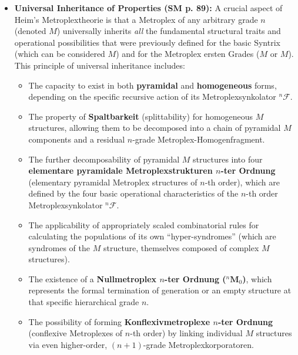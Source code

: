 \documentclass[12pt]{article}
\newcommand{\q}[1]{\enquote{#1}}
\def\metroplex#1#2{M}%
\newcommand{\hypersyntrix}{\metroplex{1}{F}}
\newcommand{\metroplexsynkolator}[1]{{}^{#1}\mathcal{F}}
\newcommand{\nullmetroplex}[1]{{}^{#1}\mathbf{M}_0}
\begin{document}
\begin{itemize}
    \item \textbf{Universal Inheritance of Properties (SM p. 89):}
    A crucial aspect of Heim's Metroplextheorie is that a Metroplex of any arbitrary grade \( n \) (denoted \( \metroplex{n}{} \)) universally inherits \textit{all} the fundamental structural traits and operational possibilities that were previously defined for the basic Syntrix (which can be considered \( \metroplex{0}{} \)) and for the Metroplex ersten Grades (\( \hypersyntrix \) or \( \metroplex{1}{} \)). This principle of universal inheritance includes:
    \begin{itemize}
        \item The capacity to exist in both \textbf{pyramidal} and \textbf{homogeneous} forms, depending on the specific recursive action of its Metroplexsynkolator \( \metroplexsynkolator{n}{} \).
        \item The property of \textbf{Spaltbarkeit} (splittability) for homogeneous \( \metroplex{n}{} \) structures, allowing them to be decomposed into a chain of pyramidal \( \metroplex{n}{} \) components and a residual \( n \)-grade Metroplex-Homogenfragment.
        \item The further decomposability of pyramidal \( \metroplex{n}{} \) structures into four \textbf{elementare pyramidale Metroplexstrukturen \( n \)-ter Ordnung} (elementary pyramidal Metroplex structures of \(n\)-th order), which are defined by the four basic operational characteristics of the \(n\)-th order Metroplexsynkolator \( \metroplexsynkolator{n}{} \).
        \item The applicability of appropriately scaled combinatorial rules for calculating the populations of its own \q{hyper-syndromes} (which are syndromes of the \( \metroplex{n}{} \) structure, themselves composed of complex \( \metroplex{n-1}{} \) structures).
        \item The existence of a \textbf{Nullmetroplex \( n \)-ter Ordnung (\( \nullmetroplex{n} \))}, which represents the formal termination of generation or an empty structure at that specific hierarchical grade \(n\).
        \item The possibility of forming \textbf{Konflexivmetroplexe \( n \)-ter Ordnung} (conflexive Metroplexes of \(n\)-th order) by linking individual \( \metroplex{n}{} \) structures via even higher-order, \( (n+1) \)-grade Metroplexkorporatoren.
    \end{itemize}


\end{itemize}
\end{document}
